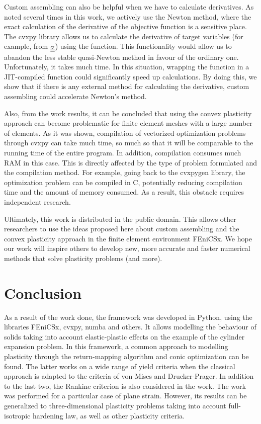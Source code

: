 \documentclass[12pt]{article}
\begin{document}
Custom assembling can also be helpful when we have to calculate derivatives. As noted several times in this work, we actively use the Newton method, where the exact calculation of the derivative of the objective function is a sensitive place. The cvxpy library allows us to calculate the derivative of target variables (for example, from $\underline{\underline{\sigma}}$) using the  function. This functionality would allow us to abandon the less stable quasi-Newton method in favour of the ordinary one. Unfortunately, it takes much time. In this situation, wrapping the  function in a JIT-compiled function could significantly speed up calculations. By doing this, we show that if there is any external method for calculating the derivative, custom assembling could accelerate Newton's method. 

Also, from the work results, it can be concluded that using the convex plasticity approach can become problematic for finite element meshes with a large number of elements. As it was shown, compilation of vectorized optimization problems through cvxpy can take much time, so much so that it will be comparable to the running time of the entire program. In addition, compilation consumes much RAM in this case. This is directly affected by the type of problem formulated and the compilation method. For example, going back to the cvxpygen library, the optimization problem can be compiled in C, potentially reducing compilation time and the amount of memory consumed. As a result, this obstacle requires independent research.

Ultimately, this work is distributed in the public domain. This allows other researchers to use the ideas proposed here about custom assembling and the convex plasticity approach in the finite element environment FEniCSx. We hope our work will inspire others to develop new, more accurate and faster numerical methods that solve plasticity problems (and more).

\newpage
{}
{}
\section*{Conclusion}
\label{sec:conclusion}

As a result of the work done, the framework was developed in Python, using the libraries FEniCSx, cvxpy, numba and others. It allows modelling the behaviour of solids taking into account elastic-plastic effects on the example of the cylinder expansion problem. In this framework, a common approach to modelling plasticity through the return-mapping algorithm and conic optimization can be found. The latter works on a wide range of yield criteria when the classical approach is adapted to the criteria of von Mises and Drucker-Prager. In addition to the last two, the Rankine criterion is also considered in the work. The work was performed for a particular case of plane strain. However, its results can be generalized to three-dimensional plasticity problems taking into account full-isotropic hardening law, as well as other plasticity criteria.
\end{document}
